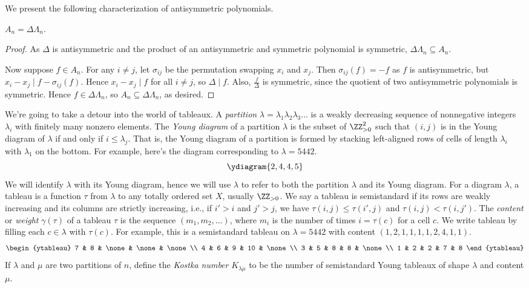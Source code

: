 \documentclass[11pt]{scrartcl}
\begin{document}
We present the following characterization of antisymmetric polynomials.
\begin{lemma}
    $A_n = \Delta \Lambda_n$.
\end{lemma}

\begin{proof}
    As $\Delta$ is antisymmetric and the product of an antisymmetric and symmetric polynomial is symmetric, $\Delta\Lambda_n \subseteq A_n$.
    
    Now suppose $f \in A_n$. For any $i \neq j$, let $\sigma_{ij}$ be the permutation swapping $x_i$ and $x_j$. Then $\sigma_{ij}(f) = -f$ as $f$ is antisymmetric, but $x_i - x_j \mid f - \sigma_{ij}(f)$. Hence $x_i - x_j \mid f$ for all $i \neq j$, so $\Delta \mid f$. Also, $\frac f{\Delta}$ is symmetric, since the quotient of two antisymmetric polynomials is symmetric. Hence $f \in \Delta \Lambda_n$, so $A_n \subseteq \Delta \Lambda_n$, as desired.
\end{proof}

We're going to take a detour into the world of tableaux. A \emph{partition} $\lambda = \lambda_1\lambda_2\lambda_3 \dots$ is a weakly decreasing sequence of nonnegative integers $\lambda_i$ with finitely many nonzero elements. The \emph{Young diagram} of a partition $\lambda$ is the subset of $\ZZ_{>0}^2$ such that $(i,j)$ is in the Young diagram of $\lambda$ if and only if $i \le \lambda_j$. That is, the Young diagram of a partition is formed by stacking left-aligned rows of cells of length $\lambda_i$ with $\lambda_1$ on the bottom. For example, here's the diagram corresponding to $\lambda = 5442$.
\[\ydiagram{2,4,4,5}\]
We will identify $\lambda$ with its Young diagram, hence we will use $\lambda$ to refer to both the partition $\lambda$ and its Young diagram. For a diagram $\lambda$, a tableau is a function $\tau$ from $\lambda$ to any totally ordered set $X$, usually $\ZZ_{>0}$. We say a tableau is semistandard if its rows are weakly increasing and its columns are strictly increasing, i.e., if $i' > i$ and $j' > j$, we have $\tau(i,j) \le \tau(i',j)$ and $\tau(i,j) < \tau(i,j')$. The \emph{content} or \emph{weight} $\gamma(\tau)$ of a tableau $\tau$ is the sequence $(m_1,m_2,\dots)$, where $m_i$ is the number of times $i = \tau(c)$ for a cell $c$. We write tableau by filling each $c \in \lambda$ with $\tau(c)$. For example, this is a semistandard tableau on $\lambda = 5442$ with content $(1,2,1,1,1,1,2,4,1,1)$.
\[\begin{ytableau}
	7 & 8 & \none & \none & \none \\
	4 & 6 & 9 & 10 & \none \\
	3 & 5 & 8 & 8 & \none \\
	1 & 2 & 2 & 7 & 8
\end{ytableau}\]
If $\lambda$ and $\mu$ are two partitions of $n$, define the \emph{Kostka number} $K_{\lambda\mu}$ to be the number of semistandard Young tableaux of shape $\lambda$ and content $\mu$.
\end{document}
